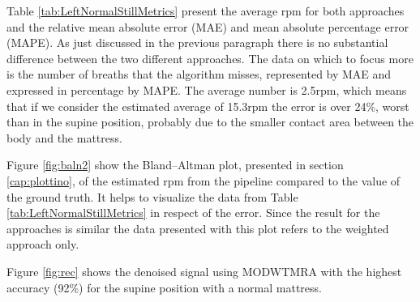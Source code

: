 \vspace{1cm}
%


\vspace{0.5cm}

Table \ref{tab:LeftNormalStillMetrics} present the average rpm for both approaches  
and the relative mean absolute error (MAE) and mean absolute percentage error (MAPE). As just discussed in the previous paragraph there is no substantial difference between the two different approaches. The data on which to focus more is the number of breaths that the algorithm misses, represented by MAE and expressed in percentage by MAPE. The average number is 2.5rpm, which means that if we consider the estimated average of 15.3rpm the error is over 24\%, worst than in the supine position, probably due to the smaller contact area between the body and the mattress.

\vspace{1cm}

\vspace{0.5cm}

Figure \ref{fig:baln2} show the Bland–Altman plot, presented in section \ref{cap:plottino}, of the estimated rpm from the pipeline compared to the value of the ground truth. It helps to visualize the data from Table \ref{tab:LeftNormalStillMetrics} in respect of the error. Since the result for the approaches is similar the data presented with this plot refers to the weighted approach only.

Figure \ref{fig:rec} shows the denoised signal using MODWTMRA with the highest accuracy (92\%) for the supine position with a normal mattress.

